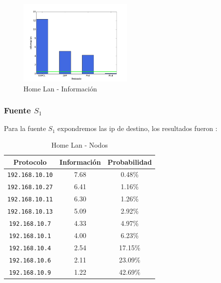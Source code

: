 \documentclass[final,inline,narroweqnarray,a4paper]{ieee}
\begin{document}
\begin{figure}[H]
    \begin{center}
        \includegraphics[width=0.5\textwidth]{plot/homelanS-bar.png}
        \caption{Home Lan - Información}
        \label{histo:homelanS}
    \end{center}
\end{figure}

\subsubsection{Fuente $S_1$}
Para la fuente $S_1$ expondremos las ip de destino, los resultados fueron :

\begin{table}[H]
    \begin{center}
        \begin{tabular}{|c|c|c|}
            \hline
            \textbf{Protocolo} & \textbf{Información} & \textbf{Probabilidad} \\ \hline
            \texttt{192.168.10.10}&7.68        & 0.48\%     \\ \hline
            \texttt{192.168.10.27}&6.41        & 1.16\%     \\ \hline
            \texttt{192.168.10.11}&6.30        & 1.26\%     \\ \hline
            \texttt{192.168.10.13}&5.09        & 2.92\%     \\ \hline
            \texttt{192.168.10.7}&4.33         & 4.97\%     \\ \hline
            \texttt{192.168.10.1}&4.00         & 6.23\%     \\ \hline
            \texttt{192.168.10.4}&2.54         & 17.15\%    \\ \hline
            \texttt{192.168.10.6}&2.11         & 23.09\%    \\ \hline
            \texttt{192.168.10.9}&1.22         & 42.69\%    \\ \hline
        \end{tabular}
        \caption{Home Lan - Nodos}
        \label{table:homelanS1}
    \end{center}
\end{table}
\end{document}
